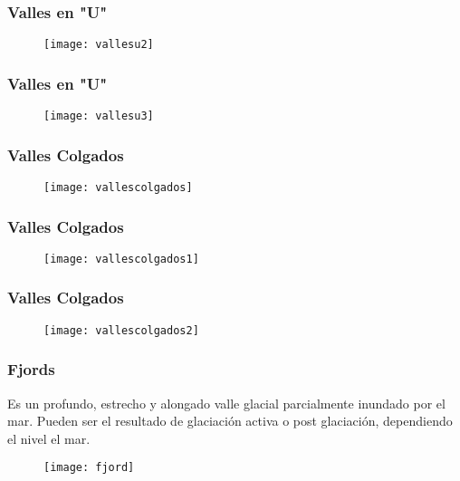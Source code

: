 \documentclass{beamer}
\begin{document}
\begin{frame}
\frametitle{Valles en "U"}
\begin{figure}
\begin{center}
\texttt{[image: vallesu2]}
\end{center}
\end{figure}
\end{frame}
\begin{frame}
\frametitle{Valles en "U"}
\begin{figure}
\begin{center}
\texttt{[image: vallesu3]}
\end{center}
\end{figure}
\end{frame}
\begin{frame}
\frametitle{Valles Colgados}
\begin{figure}
\begin{center}
\texttt{[image: vallescolgados]}
\end{center}
\end{figure}
\end{frame}
\begin{frame}
\frametitle{Valles Colgados}
\begin{figure}
\begin{center}
\texttt{[image: vallescolgados1]}
\end{center}
\end{figure}
\end{frame}
\begin{frame}
\frametitle{Valles Colgados}
\begin{figure}
\begin{center}
\texttt{[image: vallescolgados2]}
\end{center}
\end{figure}
\end{frame}
\begin{frame}
\frametitle{Fjords}
\small{Es un profundo, estrecho y alongado valle glacial parcialmente inundado por el mar. Pueden ser el resultado de glaciación activa o post glaciación, dependiendo el nivel el mar.}
\begin{figure}
\begin{center}
\texttt{[image: fjord]}
\end{center}
\end{figure}
\end{frame}
\end{document}
